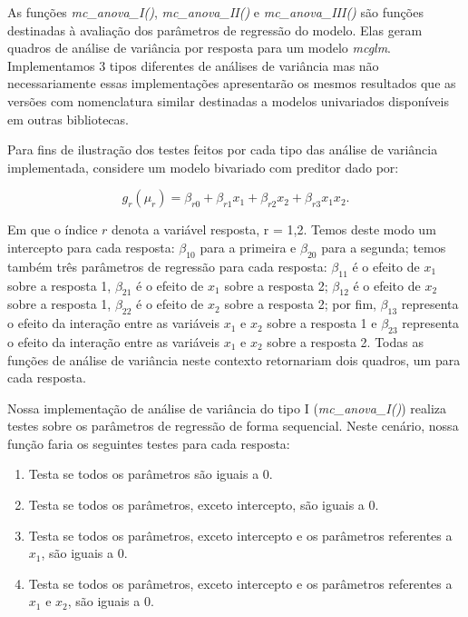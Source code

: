 As funções \emph{mc\_anova\_I()}, \emph{mc\_anova\_II()} e \emph{mc\_anova\_III()} são funções destinadas à avaliação dos parâmetros de regressão do modelo. Elas geram quadros de análise de variância por resposta para um modelo \emph{mcglm}. Implementamos 3 tipos diferentes de análises de variância mas não necessariamente essas implementações apresentarão os mesmos resultados que as versões com nomenclatura similar destinadas a modelos univariados disponíveis em outras bibliotecas.

Para fins de ilustração dos testes feitos por cada tipo das análise de variância implementada, considere um modelo bivariado com preditor dado por:

\begin{equation}
g_r(\mu_r) = \beta_{r0} + \beta_{r1} x_1 + \beta_{r2} x_2 + \beta_{r3} x_1x_2.
\end{equation}

\noindent Em que o índice $r$ denota a variável resposta, r = 1,2. Temos deste modo um intercepto para cada resposta: $\beta_{10}$ para a primeira e $\beta_{20}$ para a segunda; temos também três parâmetros de regressão para cada resposta: $\beta_{11}$ é o efeito de $x_1$ sobre a resposta 1, $\beta_{21}$ é o efeito de $x_1$ sobre a resposta 2; $\beta_{12}$ é o efeito de $x_2$ sobre a resposta 1, $\beta_{22}$ é o efeito de $x_2$ sobre a resposta 2; por fim, $\beta_{13}$ representa o efeito da interação entre as variáveis $x_1$ e $x_2$ sobre a resposta 1 e $\beta_{23}$ representa o efeito da interação entre as variáveis $x_1$ e $x_2$ sobre a resposta 2. Todas as funções de análise de variância neste contexto retornariam dois quadros, um para cada resposta.

Nossa implementação de análise de variância do tipo I (\emph{mc\_anova\_I()}) realiza testes sobre os parâmetros de regressão de forma sequencial. Neste cenário, nossa função faria os seguintes testes para cada resposta:

\begin{enumerate}
  \item Testa se todos os parâmetros são iguais a 0.
  \item Testa se todos os parâmetros, exceto intercepto, são iguais a 0.
  \item Testa se todos os parâmetros, exceto intercepto e os parâmetros referentes a $x_1$, são iguais a 0.
  \item Testa se todos os parâmetros, exceto intercepto e os parâmetros referentes a $x_1$ e $x_2$, são iguais a 0.
\end{enumerate}

